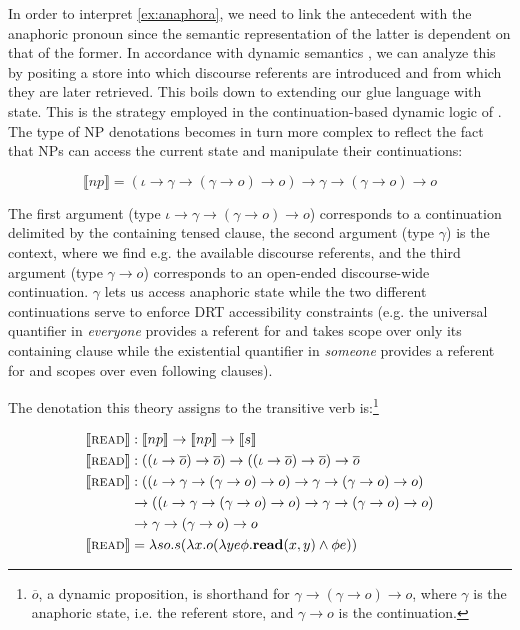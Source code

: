 \documentclass[a4paper,11pt]{easychair}
\newcommand{\sem}[1]{\llbracket #1 \rrbracket}
\begin{document}
In order to interpret \eqref{ex:anaphora}, we need to link the antecedent with
the anaphoric pronoun since the semantic representation of the latter is
dependent on that of the former. In accordance with dynamic semantics
\citep{kamp1993discourse}, we can analyze this by positing a store into which
discourse referents are introduced and from which they are later
retrieved. This boils down to extending our glue language with state. This is
the strategy employed in the continuation-based dynamic logic of
\citet{de2006towards}. The type of NP denotations becomes in turn more complex
to reflect the fact that NPs can access the current state and manipulate their
continuations:

\vspace{-1mm}

$$
\sem{np} = (\iota \to \gamma \to (\gamma \to o) \to o) \to \gamma \to (\gamma
\to o) \to o
$$

The first argument (type $\iota \to \gamma \to (\gamma \to o) \to o$)
corresponds to a continuation delimited by the containing tensed clause, the
second argument (type $\gamma$) is the context, where we find e.g. the
available discourse referents, and the third argument (type $\gamma \to o$)
corresponds to an open-ended discourse-wide continuation. $\gamma$ lets us
access anaphoric state while the two different continuations serve to enforce
DRT accessibility constraints \citep{kamp1993discourse} (e.g. the universal
quantifier in \emph{everyone} provides a referent for and takes scope over
only its containing clause while the existential quantifier in \emph{someone}
provides a referent for and scopes over even following clauses).

The denotation this theory assigns to the transitive verb
is:\footnote{$\overline{o}$, a dynamic proposition, is shorthand for $\gamma
  \to (\gamma \to o) \to o$, where $\gamma$ is the anaphoric state, i.e. the
  referent store, and $\gamma \to o$ is the continuation.}

\begin{align*}
  \sem{\textsc{read}} & : \sem{np} \to \sem{np} \to \sem{s} \\
  \sem{\textsc{read}} & : ((\iota \to \overline{o}) \to \overline{o}) \to
                          ((\iota \to \overline{o}) \to \overline{o}) \to
                          \overline{o} \\
  \sem{\textsc{read}} & : ((\iota \to \gamma \to (\gamma \to o) \to o)
                           \to \gamma \to (\gamma \to o) \to o) \\ & \to
                          ((\iota \to \gamma \to (\gamma \to o) \to o)
                           \to \gamma \to (\gamma \to o) \to o) \\ & \to
                           \gamma \to (\gamma \to o) \to o \\
  \sem{\textsc{read}} & = \lambda s o. s (\lambda x. o (\lambda y e
  \phi. \textbf{read}(x, y) \land \phi e))
\end{align*}
\end{document}
